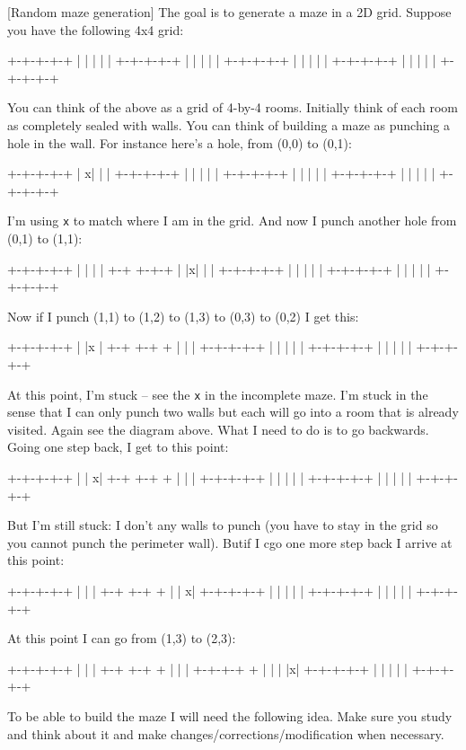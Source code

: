 [Random maze generation]
The goal is to generate a maze in a 2D grid.
Suppose you have the following 4x4 grid:
\begin{console}
+-+-+-+-+
| | | | |
+-+-+-+-+
| | | | |
+-+-+-+-+
| | | | |
+-+-+-+-+
| | | | |
+-+-+-+-+
\end{console}
You can think of the above as a grid of 4-by-4 rooms.
Initially think of each room as completely sealed with walls.
You can think of building a maze as punching a hole in the wall.
For instance here's a hole, from (0,0) to (0,1):
\begin{console}
+-+-+-+-+
|  x| | |
+-+-+-+-+
| | | | |
+-+-+-+-+
| | | | |
+-+-+-+-+
| | | | |
+-+-+-+-+
\end{console}
I'm using \texttt{x} to match where I am in the grid.
And now I punch another hole from (0,1) to (1,1):
\begin{console}
+-+-+-+-+
|   | | |
+-+ +-+-+
| |x| | |
+-+-+-+-+
| | | | |
+-+-+-+-+
| | | | |
+-+-+-+-+
\end{console}
Now if I punch (1,1) to (1,2) to (1,3) to (0,3) to (0,2) I get this:
\begin{console}
+-+-+-+-+
|   |x  |
+-+ +-+ +
| |     |
+-+-+-+-+
| | | | |
+-+-+-+-+
| | | | |
+-+-+-+-+
\end{console}
At this point, I'm stuck -- see the \texttt{x} in the incomplete maze.
I'm stuck in the sense that I can only punch two walls but each will
go into a room that is already visited. Again see the diagram above.
What I need to do is to go backwards.
Going one step back, I get to this point:
\begin{console}
+-+-+-+-+
|   |  x|
+-+ +-+ +
| |     |
+-+-+-+-+
| | | | |
+-+-+-+-+
| | | | |
+-+-+-+-+
\end{console}
But I'm still stuck: I don't any walls to punch (you have to stay in
the grid so you cannot punch the perimeter wall).
Butif I cgo one more step back I arrive at this point:
\begin{console}
+-+-+-+-+
|   |   |
+-+ +-+ +
| |    x|
+-+-+-+-+
| | | | |
+-+-+-+-+
| | | | |
+-+-+-+-+
\end{console}
At this point I can go from (1,3) to (2,3):
\begin{console}
+-+-+-+-+
|   |   |
+-+ +-+ +
| |     |
+-+-+-+ +
| | | |x|
+-+-+-+-+
| | | | |
+-+-+-+-+
\end{console}
To be able to build the maze I will need the following idea.
Make sure you study and think about it and make
changes/corrections/modification when necessary.

